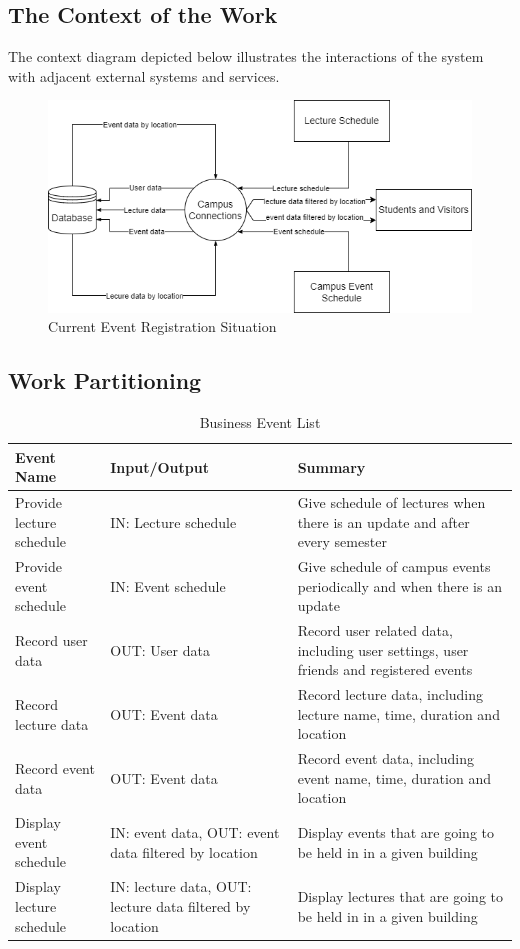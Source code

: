 \documentclass[12pt]{article}
\begin{document}
\subsection{The Context of the Work}

The context diagram depicted below illustrates the interactions of the system with adjacent external systems and services.
\begin{figure}[H]
\begin{center}
\includegraphics[scale=0.7]{Context_Diagram.png}
\end{center}
\caption{Current Event Registration Situation}
\end{figure}

\subsection{Work Partitioning}

\begin{table}[H]
  \begin{tabular}{p{} | p{} | p{}}
  \toprule
  \textbf{Event Name} & \textbf{Input/Output} & \textbf{Summary}\\
  \midrule
  Provide lecture schedule & IN: Lecture schedule & Give schedule of lectures when there is an update and after every semester\\
  \midrule
  Provide event schedule & IN: Event schedule & Give schedule of campus events periodically and when there is an update\\
  \midrule
  Record user data & OUT: User data & Record user related data, including user settings, user friends and registered events\\
  \midrule
  Record lecture data & OUT: Event data & Record lecture data, including lecture name,  time, duration and location\\
  \midrule
    Record event data & OUT: Event data & Record event data, including event name,  time,  duration and location\\
  \midrule
  Display event schedule & IN: event data, OUT: event data filtered by location & Display events that are going to be held in in a given building\\
  \midrule
  Display lecture schedule & IN: lecture data, OUT: lecture data filtered by location & Display lectures that are going to be held in in a given building\\
  \bottomrule
\end{tabular}
 \caption{Business Event List} 
 \label{TblEventList}
\end{table}
\end{document}
